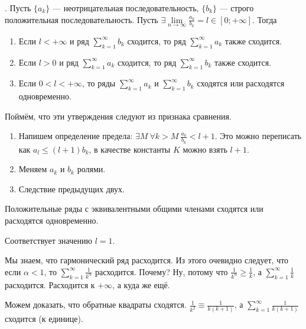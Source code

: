 \documentclass{article}
\begin{document}
\begin{itemize}
        \thm {}. Пусть $\{a_k\}$ --- неотрицательная последовательность, $\{b_k\}$ --- строго положительная последовательность. Пусть $\exists\lim\limits_{n\to\infty}\frac{a_k}{b_k}=l\in[0;+\infty]$. Тогда
        \begin{enumerate}
            \item Если $l<+\infty$ и ряд $\sum\limits_{k=1}^\infty b_k$ сходится, то ряд $\sum\limits_{k=1}^\infty a_k$ также сходится.
            \item Если $l>0$ и ряд $\sum\limits_{k=1}^\infty a_k$ сходится, то ряд $\sum\limits_{k=1}^\infty b_k$ также сходится.
            \item Если $0<l<+\infty$, то ряды $\sum\limits_{k=1}^\infty a_k$ и $\sum\limits_{k=1}^\infty b_k$ сходятся или расходятся одновременно.
        \end{enumerate}
        \begin{Proof}
            Поймём, что эти утверждения следуют из признака сравнения.
            \begin{enumerate}
                \item Напишем определение предела: $\exists M~\forall k>M~\frac{a_k}{b_k}<l+1$. Это можно переписать как $a_l\leqslant(l+1)b_k$, в качестве константы $K$ можно взять $l+1$.
                \item Меняем $a_k$ и $b_k$ ролями.
                \item Следствие предыдущих двух.
            \end{enumerate}
        \end{Proof}
        \thm Положительные ряды с эквивалентными общими членами сходятся или расходятся одновременно.
        \begin{Proof}
            Соответствует значению $l=1$.
        \end{Proof}
        \begin{Example}
            Мы знаем, что гармонический ряд расходится. Из этого очевидно следует, что если $\alpha<1$, то $\sum\limits_{k=1}^\infty \frac1{k^\alpha}$ расходится. Почему? Ну, потому что $\frac1{k^\alpha}\geqslant\frac1k$, а $\sum\limits_{k=1}^\infty \frac1k$ расходится. Расходится к $+\infty$, а куда же ещё.
        \end{Example}
        \pagebreak
        \begin{Example}
            Можем доказать, что обратные квадраты сходятся. $\frac1{k^2}\equiv\frac1{k(k+1)}$, а $\sum\limits_{k=1}^\infty \frac1{k(k+1)}$ сходится (к единице).

\end{Example}
\end{itemize}
\end{document}
